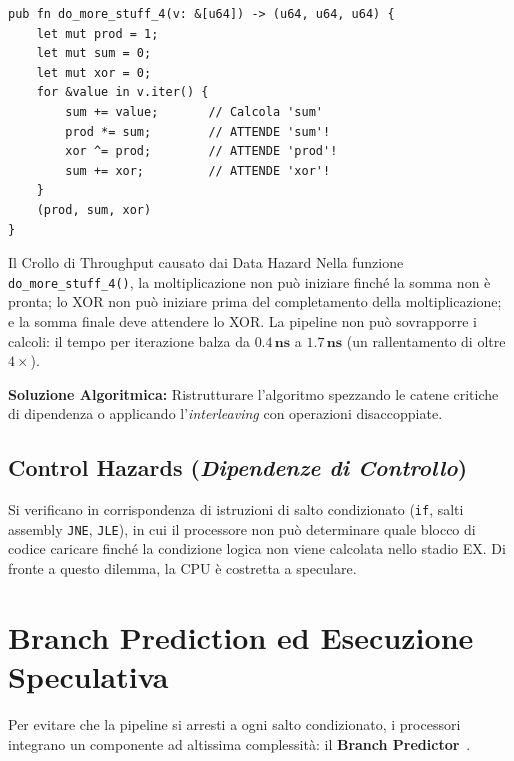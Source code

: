 \begin{lstlisting}[style=rustcode,caption={Catena di dipendenze seriali: ogni operazione dipende dal risultato della precedente.}]
pub fn do_more_stuff_4(v: &[u64]) -> (u64, u64, u64) {
    let mut prod = 1;
    let mut sum = 0;
    let mut xor = 0;
    for &value in v.iter() {
        sum += value;       // Calcola 'sum'
        prod *= sum;        // ATTENDE 'sum'!
        xor ^= prod;        // ATTENDE 'prod'!
        sum += xor;         // ATTENDE 'xor'!
    }
    (prod, sum, xor)
}
\end{lstlisting}

\begin{alertblock}{Il Crollo di Throughput causato dai Data Hazard}
Nella funzione \texttt{do\_more\_stuff\_4()}, la moltiplicazione non pu\`o iniziare finché la somma non \`e pronta; lo XOR non pu\`o iniziare prima del completamento della moltiplicazione; e la somma finale deve attendere lo XOR. 
La pipeline non pu\`o sovrapporre i calcoli: il tempo per iterazione balza da $\mathbf{0.4\,\text{ns}}$ a $\mathbf{1.7\,\text{ns}}$ (un rallentamento di oltre $4\times$).

\textbf{Soluzione Algoritmica:} Ristrutturare l'algoritmo spezzando le catene critiche di dipendenza o applicando l'\textit{interleaving} con operazioni disaccoppiate.
\end{alertblock}

\FloatBarrier
\subsection{Control Hazards (\textit{Dipendenze di Controllo})}
\label{subsec:control-hazards}
Si verificano in corrispondenza di istruzioni di salto condizionato (\texttt{if}, salti assembly \texttt{JNE}, \texttt{JLE}), in cui il processore non pu\`o determinare quale blocco di codice caricare finché la condizione logica non viene calcolata nello stadio EX. Di fronte a questo dilemma, la CPU \`e costretta a speculare.

\FloatBarrier
\section{Branch Prediction ed Esecuzione Speculativa}
\label{sec:branch-prediction}

Per evitare che la pipeline si arresti a ogni salto condizionato, i processori integrano un componente ad altissima complessit\`a: il \textbf{Branch Predictor}~\cite{bakhvalov2024,slotin2023}.

